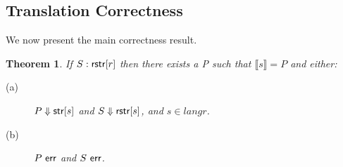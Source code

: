 \documentclass{acm_proc_article-sp}
\newtheorem{thm}{Theorem}
\theoremstyle{definition}
\newcommand{\sistr}[1]{{\sf rstr}[#1]}   \newcommand{\rstr}[1]{{\sf rstr}[#1]} %
\newcommand{\strin}[1]{\sistr{#1}}
\renewcommand{\tstr}[1]{{{\sf str}[#1]}}
\newcommand{\err}{\ {\sf err}}
\newcommand{\trden}[1]{\llbracket #1 \rrbracket} %
\newcommand{\treduces}{ \Downarrow }
\newcommand{\sreduces}{ \Downarrow }
\begin{document}
\subsection{Translation Correctness}

We now present the main correctness result.

\begin{thm}
If $S : \strin{r}$ then there exists a P such that $\trden{s} = P$ and either: 
\begin{description}
  \item[(a)] $P \treduces \tstr{s}$ and $S \sreduces \strin{s}$, and $s \in lang{r}$.
  \item[(b)] $P \err$ and $S \err$.
  \end{description}
\end{thm}
\end{document}
